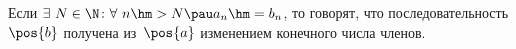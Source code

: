 
        Если $\exists\  N\in\N\colon \forall\  n\hm>N\pau a_n\hm=b_n$, то говорят, что последовательность $\pos{b}$ получена из~$\pos{a}$ изменением конечного числа членов.
    